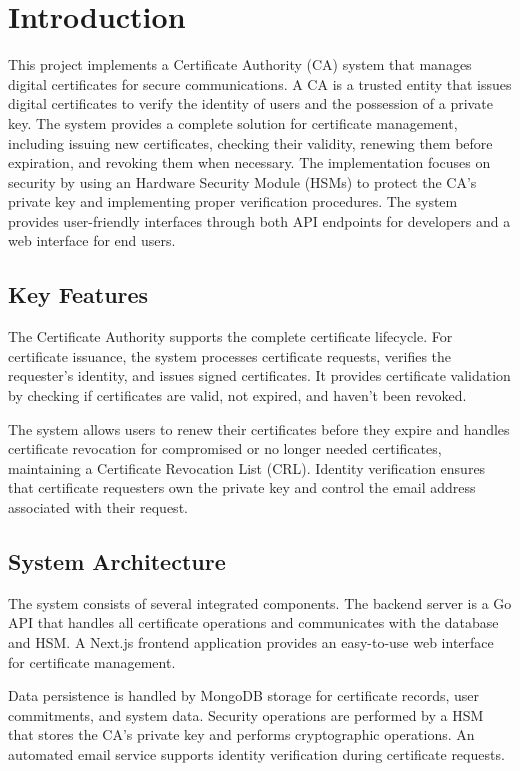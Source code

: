 \chapter{Introduction}
\label{ch:introduction}
This project implements a Certificate Authority (CA) system that manages digital certificates for 
secure communications. A CA is a trusted entity that issues digital certificates to verify the identity 
of users and the possession of a private key.
The system provides a complete solution for certificate management, including issuing new certificates, 
checking their validity, renewing them before expiration, and revoking them when necessary. 
The implementation focuses on security by using an Hardware Security Module (HSMs) to protect
the CA's private key and implementing proper verification procedures.
The system provides user-friendly interfaces through both API endpoints for developers and a web 
interface for end users. 

\section{Key Features}

The Certificate Authority supports the complete certificate lifecycle. 
For certificate issuance, the system processes certificate requests, verifies the requester's identity, 
and issues signed certificates. 
It provides certificate validation by checking if certificates are valid, not expired, and haven't been revoked.

The system allows users to renew their certificates before they expire and handles certificate revocation 
for compromised or no longer needed certificates, maintaining a Certificate Revocation List (CRL). 
Identity verification ensures that certificate requesters own the private key and control the email 
address associated with their request.

\section{System Architecture}

The system consists of several integrated components. The backend server is a Go API that handles 
all certificate operations and communicates with the database and HSM. 
A Next.js frontend application provides an easy-to-use web interface for certificate management.

Data persistence is handled by MongoDB storage for certificate records, user commitments, and system data. 
Security operations are performed by a HSM that stores the CA's private key 
and performs cryptographic operations. 
An automated email service supports identity verification during certificate requests.

